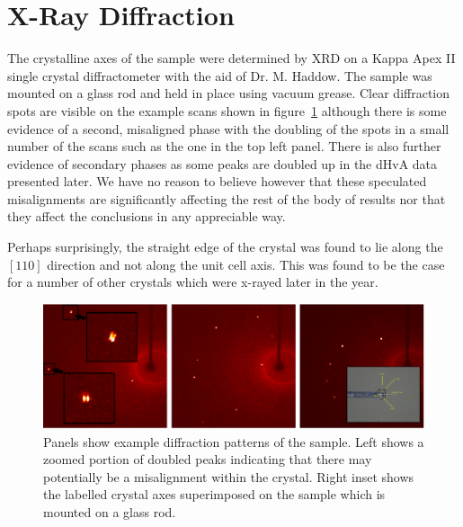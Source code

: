 
\section{X-Ray Diffraction}
    \label{Sec:ResD:XrayDiffraction}

The crystalline axes of the sample were determined by \ac{XRD} on a Kappa Apex II single crystal diffractometer with the aid of Dr. M. Haddow. The sample was mounted on a glass rod and held in place using vacuum grease. Clear diffraction spots are visible on the example scans shown in figure~\ref{Fig:ResD:XRayDiffraction} although there is some evidence of a second, misaligned phase with the doubling of the spots in a small number of the scans such as the one in the top left panel. There is also further evidence of secondary phases as some peaks are doubled up in the dHvA data presented later. We have no reason to believe however that these speculated misalignments are significantly affecting the rest of the body of results nor that they affect the conclusions in any appreciable way.

Perhaps surprisingly, the straight edge of the crystal was found to lie along the $[110]$ direction and not along the unit cell axis. This was found to be the case for a number of other \BaFeAsP{} crystals which were x-rayed later in the year.

\begin{figure}[htbp]
    \begin{center}
        \includegraphics[scale=0.7]{Chapter-dHvABaFe2P2/Figures/Xrays/XRayDiffraction/XRayDiffraction}
        \caption{Panels show example diffraction patterns of the \BaFeP{} sample. Left shows a zoomed portion of doubled peaks indicating that there may potentially be a misalignment within the crystal. Right inset shows the labelled crystal axes superimposed on the sample which is mounted on a glass rod.}
        \label{Fig:ResD:XRayDiffraction}
    \end{center}
\end{figure}

